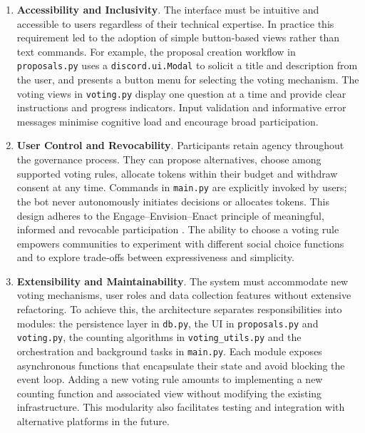 \begin{enumerate}
    \item \textbf{Accessibility and Inclusivity}.  The interface must be
    intuitive and accessible to users regardless of their technical
    expertise.  In practice this requirement led to the adoption of
    simple button‑based views rather than text commands.  For example,
    the proposal creation workflow in \texttt{proposals.py} uses a
    \texttt{discord.ui.Modal} to solicit a title and description from
    the user, and presents a button menu for selecting the voting
    mechanism.  The voting views in \texttt{voting.py} display one
    question at a time and provide clear instructions and progress
    indicators.  Input validation and informative error messages
    minimise cognitive load and encourage broad participation.
    \item \textbf{User Control and Revocability}.  Participants retain
    agency throughout the governance process.  They can propose
    alternatives, choose among supported voting rules, allocate tokens within their budget and withdraw consent at any
    time.  Commands in \texttt{main.py} are explicitly invoked by
    users; the bot never autonomously initiates decisions or allocates
    tokens.  This design adheres to the Engage–Envision–Enact
    principle of meaningful, informed and revocable participation
    \cite{Mertzani2023Engage}.  The ability to choose a voting rule
    empowers communities to experiment with different social choice
    functions and to explore trade‑offs between expressiveness and
    simplicity.
    \item \textbf{Extensibility and Maintainability}.  The system must
    accommodate new voting mechanisms, user roles and data collection
    features without extensive refactoring.  To achieve this, the
    architecture separates responsibilities into modules: the
    persistence layer in \texttt{db.py}, the UI in
    \texttt{proposals.py} and \texttt{voting.py}, the counting
    algorithms in \texttt{voting\_utils.py} and the orchestration and
    background tasks in \texttt{main.py}.  Each module exposes
    asynchronous functions that encapsulate their state and avoid
    blocking the event loop.  Adding a new voting rule amounts to
    implementing a new counting function and associated view without
    modifying the existing infrastructure.  This modularity also
    facilitates testing and integration with alternative platforms in
    the future.
\end{enumerate}

